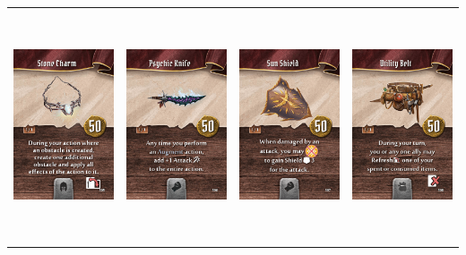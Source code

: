 \documentclass{minimal}
\begin{document}
{\begin{longtable}{llll}
\includegraphics[width=44mm,height=68mm]{./64-151/gh-138-stone-charm.png} &
\includegraphics[width=44mm,height=68mm]{./64-151/gh-139-psychic-knife.png} &
\includegraphics[width=44mm,height=68mm]{./64-151/gh-140-sun-shield.png} &
\includegraphics[width=44mm,height=68mm]{./64-151/gh-141-utility-belt.png}\\ 

\end{longtable}}
\end{document}
